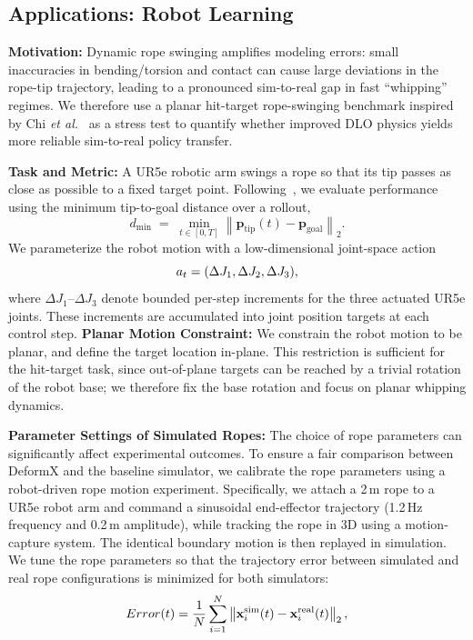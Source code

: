 \documentclass[letterpaper, 10 pt, conference]{ieeeconf}  %
\begin{document}
\subsection{Applications: Robot Learning}

\noindent\textbf{Motivation:}
Dynamic rope swinging amplifies modeling errors: small inaccuracies in bending/torsion and contact can cause large deviations in the rope-tip trajectory, leading to a pronounced sim-to-real gap in fast ``whipping'' regimes. We therefore use a planar hit-target rope-swinging benchmark inspired by Chi \emph{et al.}~\cite{irp} as a stress test to quantify whether improved DLO physics yields more reliable sim-to-real policy transfer.

\noindent\textbf{Task and Metric:}
A UR5e robotic arm swings a rope so that its tip passes as close as possible to a fixed target point. Following~\cite{irp}, we evaluate performance using the minimum tip-to-goal distance over a rollout,
\begin{equation}
d_{\min} \;=\; \min_{t \in [0,T]} \left\| \mathbf{p}_{\mathrm{tip}}(t) - \mathbf{p}_{\mathrm{goal}} \right\|_2.
\label{eq:dmin}
\end{equation}
We parameterize the robot motion with a low-dimensional joint-space action
\begin{equation}
\vspace{-2pt}
a_t = (\Delta J_1, \Delta J_2, \Delta J_3),
\end{equation}
where $\Delta J_1$--$\Delta J_3$ denote bounded per-step increments for the three actuated UR5e joints. These increments are accumulated into joint position targets at each control step.
\noindent\textbf{Planar Motion Constraint:}
We constrain the robot motion to be planar, and define the target location in-plane. This restriction is sufficient for the hit-target task, since out-of-plane targets can be reached by a trivial rotation of the robot base; we therefore fix the base rotation and focus on planar whipping dynamics.

\noindent\textbf{Parameter Settings of Simulated Ropes:}
The choice of rope parameters can significantly affect experimental outcomes. To ensure a fair comparison between DeformX and the baseline simulator, we calibrate the rope parameters using a robot-driven rope motion experiment. Specifically, we attach a 2\,m rope to a UR5e robot arm and command a sinusoidal end-effector trajectory (1.2\,Hz frequency and 0.2\,m amplitude), while tracking the rope in 3D using a motion-capture system. The identical boundary motion is then replayed in simulation. We tune the rope parameters so that the trajectory error between simulated and real rope configurations is minimized for both simulators:
\begin{equation}
    \vspace{-3pt}
   Error(t)=\frac{1}{N}\sum_{i=1}^{N}\left\lVert \mathbf{x}^{\mathrm{sim}}_{i}(t)-\mathbf{x}^{\mathrm{real}}_{i}(t)\right\rVert_{2}, 
   \label{eq:error}
   \vspace{0pt}
\end{equation}
\end{document}
